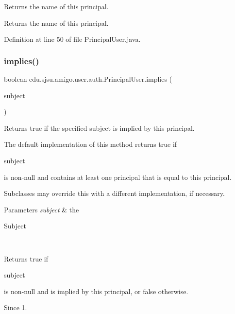 Returns the name of this principal.

\begin{DoxyReturn}{Returns}
the name of this principal. 
\end{DoxyReturn}


Definition at line 50 of file Principal\+User.\+java.

\mbox{\label{classedu_1_1sjsu_1_1amigo_1_1user_1_1auth_1_1_principal_user_ae5d437f606022a8c2a46dbf808fa5685}} 
\subsubsection{\texorpdfstring{implies()}{implies()}}
{\footnotesize\ttfamily boolean edu.\+sjsu.\+amigo.\+user.\+auth.\+Principal\+User.\+implies (\begin{DoxyParamCaption}\item[{Subject}]{subject }\end{DoxyParamCaption})}

Returns true if the specified subject is implied by this principal. 

The default implementation of this method returns true if 
\begin{DoxyCode}
subject 
\end{DoxyCode}
 is non-\/null and contains at least one principal that is equal to this principal. 

Subclasses may override this with a different implementation, if necessary.


\begin{DoxyParams}{Parameters}
{\em subject} & the
\begin{DoxyCode}
Subject 
\end{DoxyCode}
 \\
\hline
\end{DoxyParams}
\begin{DoxyReturn}{Returns}
true if
\begin{DoxyCode}
subject 
\end{DoxyCode}
 is non-\/null and is implied by this principal, or false otherwise. 
\end{DoxyReturn}
\begin{DoxySince}{Since}
1. 
\end{DoxySince}


